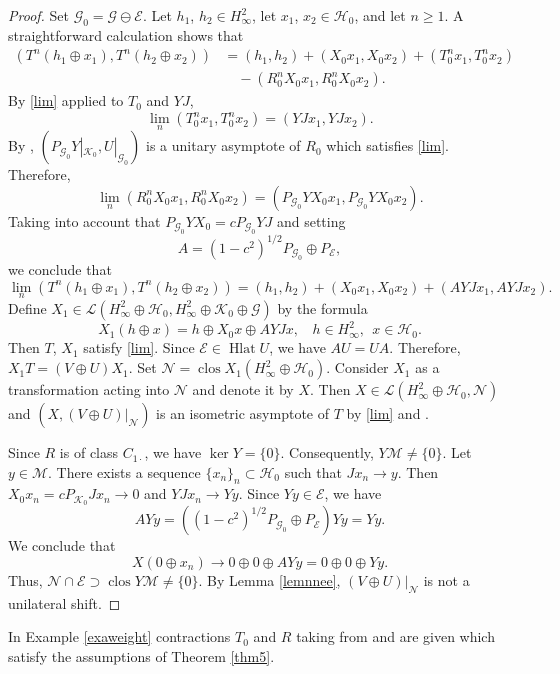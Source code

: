 \documentclass[a4paper,oneside,11pt]{amsart}
\numberwithin{equation}{section}
\theoremstyle{plain}
\theoremstyle{definition}
\begin{document}
\begin{proof}
Set  $\mathcal G_0=\mathcal G\ominus\mathcal E$. Let $h_1$, $h_2\in H^2_\infty$, let $x_1$, $x_2\in\mathcal H_0$, and let $n\geq 1$. A straightforward 
calculation shows that
\begin{equation*}\begin{aligned} (T^n(h_1\oplus x_1), T^n(h_2\oplus x_2))&=(h_1,h_2)+(X_0x_1,X_0x_2)+(T_0^nx_1,T_0^nx_2)\\&\quad  -(R_0^nX_0x_1,R_0^nX_0x_2).\end{aligned}\end{equation*}
By \eqref{lim} applied to $T_0$ and $YJ$, 
$$\lim_n(T_0^nx_1,T_0^nx_2)=(YJx_1,YJx_2).$$
By {\cite[Theorem 3(c)]{ker89}}, $(P_{\mathcal G_0}Y|_{\mathcal K_0}, U|_{\mathcal G_0})$ is a unitary asymptote of $R_0$ which satisfies \eqref{lim}. 
Therefore, $$\lim_n(R_0^nX_0x_1,R_0^nX_0x_2)=(P_{\mathcal G_0}YX_0x_1,P_{\mathcal G_0}YX_0x_2).$$
Taking into account that $P_{\mathcal G_0}YX_0=cP_{\mathcal G_0}YJ$ and setting 
$$A=(1-c^2)^{1/2}P_{\mathcal G_0}\oplus P_{\mathcal E},$$
we conclude that 
$$ \lim_n(T^n(h_1\oplus x_1), T^n(h_2\oplus x_2))=(h_1,h_2)+(X_0x_1,X_0x_2)+(AYJx_1,AYJx_2).$$
Define $X_1\in\mathcal L(H^2_\infty\oplus\mathcal H_0, H^2_\infty\oplus\mathcal K_0\oplus\mathcal G)$ by the formula 
$$X_1(h\oplus x)=h\oplus X_0x\oplus AYJx, \ \ \ \ h\in H^2_\infty, \ \  x\in\mathcal H_0.$$
Then $T$, $X_1$ satisfy \eqref{lim}. 
Since  $\mathcal E\in \operatorname{Hlat}U$, we have $AU=UA$. Therefore, $X_1T=(V\oplus U)X_1$. 
Set $\mathcal N=\operatorname{clos} X_1(H^2_\infty\oplus\mathcal H_0)$.
Consider $X_1$ as  a transformation acting into $\mathcal N$ and denote it by $X$. Then 
 $X\in\mathcal L(H^2_\infty\oplus\mathcal H_0, \mathcal N)$ and  $(X, (V\oplus U)|_{\mathcal N})$  
is an isometric asymptote of $T$ by \eqref{lim} and \cite{ker89}. 

Since $R$ is of class $C_{1\cdot}$, we have $\ker Y=\{0\}$. Consequently, $Y\mathcal M\neq\{0\}$. 
Let $y\in\mathcal M$. There exists  a sequence $\{x_n\}_n\subset\mathcal H_0$  such that $Jx_n\to y$. Then 
$X_0x_n=cP_{\mathcal K_0}Jx_n\to 0$ and $YJx_n\to Yy$.  Since $Yy\in\mathcal E$, we have 
$$AYy =((1-c^2)^{1/2}P_{\mathcal G_0}\oplus P_{\mathcal E})Yy=Yy.$$ We conclude that 
$$X(0\oplus x_n)\to 0\oplus 0\oplus AYy = 0\oplus 0\oplus Yy.$$
Thus, $\mathcal N\cap\mathcal E\supset\operatorname{clos}Y\mathcal M\neq\{0\}$.
By Lemma \ref{lemnnee}, $(V\oplus U)|_{\mathcal N}$ is not a unilateral shift. 
\end{proof}

In Example \ref{exaweight} contractions $T_0$ and $R$ taking from \cite{est} and \cite{kersz}   are given which satisfy the assumptions of Theorem \ref{thm5}. 
\end{document}

